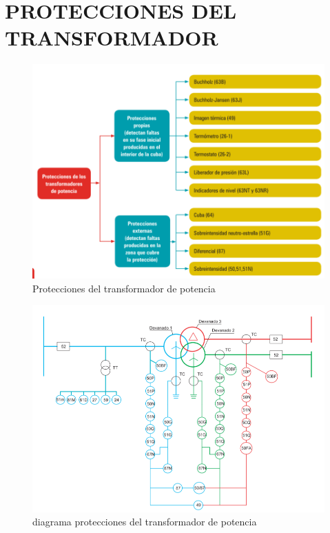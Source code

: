 \documentclass[a5paper]{book}%
\begin{document}
\section{PROTECCIONES DEL TRANSFORMADOR}

\begin{figure}[H]
	\centering  
	\caption{Protecciones del transformador de potencia}
	\label{fig:proteccionestrafo}
	\includegraphics[width=\linewidth]{proteccion_trafo}
\end{figure}

\begin{figure}[H]
	\centering  
	\caption{diagrama protecciones del  transformador de potencia}
	\label{fig:diagramatrafo}
	\includegraphics[width=\linewidth]{diagramapttrafo}
\end{figure}
\end{document}
